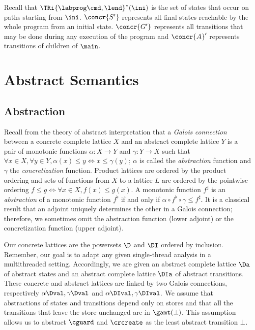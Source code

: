 \documentclass[12pt]{article}
\begin{document}
Recall that \(\TRi{\labprog \cmd,\lend}^{\star} (\ini)\) is the set of states that occur on paths starting from \(\ini\).
\(\concr{S'}\) represents all final states reachable by the whole program from an initial state. \(\concr{G'}\) represents all transitions that may be done during any execution of the program and \(\concr{A}'\) represents transitions of children of \(\main\).

\section{Abstract Semantics}
\label{abstract}

\subsection{Abstraction}
\tableabstraction

Recall from the theory of abstract interpretation \cite{CousotCousot04-WCC} that  
a \emph{Galois connection} \cite{ContinuousLatticesandDomains} between a concrete complete lattice \(X\) and an abstract complete lattice \(Y\) is a pair of monotonic functions \(\alpha : X \rightarrow  Y\) and \(\gamma : Y \rightarrow  X\) 
such that \(\forall x\in X , \forall y\in Y,  \alpha(x)\leqslant y\Leftrightarrow x\leqslant \gamma(y)\); \(\alpha\) is called the \emph{abstraction} function and \(\gamma\) the \emph{concretization} function.  
Product lattices are ordered by the product ordering and sets of functions from \(X\) to a lattice \(L\) are ordered by the pointwise ordering \( f\leqslant g \Leftrightarrow \forall x \in X, f(x)\leqslant g(x)\).
A monotonic function \(f^{\sharp}\) is an \emph{abstraction} of a monotonic function \(f^{\flat}\) if and only if \(\alpha\circ f^{\flat}\circ\gamma  \leqslant f^{\sharp}\). 
It is a classical result \cite{ContinuousLatticesandDomains} that an adjoint uniquely determines the other in a Galois connection; therefore, we sometimes omit the abstraction function (lower adjoint) or the concretization function (upper adjoint). 


Our concrete lattices are the powersets \(\D\) and \(\DI\) ordered by inclusion.
Remember, our goal is to adapt any given single-thread analysis in a multithreaded setting. Accordingly, we are given an abstract complete lattice \(\Da\) of abstract states and an abstract complete lattice \(\DIa\) of abstract transitions.
These concrete and abstract lattices are linked by two Galois connections, respectively \(\alpha\Dval,\gamma\Dval\) and \(\alpha\DIval,\gamma\DIval\). 
We assume that abstractions of states and  transitions depend only on stores and that all the transitions that leave the store unchanged are in \(\gamt(\bot)\). This assumption allows us to abstract \(\cguard\) and \(\crcreate\) as the least abstract transition \(\bot\).
\end{document}
